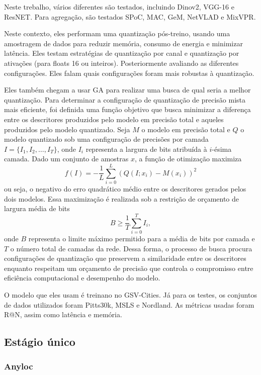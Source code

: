 \documentclass[letterpaper, 10 pt, conference]{ieeeconf}  %
\begin{document}
Neste trebalho, vários  diferentes são testados, incluindo Dinov2, VGG-16 e ResNET. Para agregação, são testados SPoC, MAC, GeM, NetVLAD e MixVPR. 

Neste contexto, eles performam uma quantização pós-treino, usando uma amostragem de dados para reduzir memória, consumo de energia e minimizar latência. Eles testam estratégias de quantização por canal e quantização por ativações (para floats 16 ou inteiros). Posteriormente avaliando as diferentes configurações. Eles falam quais configurações foram mais robustas à quantização.

Eles também chegam a usar GA para realizar uma busca de qual seria a melhor quantização. Para determinar a configuração de quantização de precisão mista mais eficiente, foi definida uma função objetivo que busca minimizar a diferença entre os descritores produzidos pelo modelo em precisão total e aqueles produzidos pelo modelo quantizado. Seja $M$ o modelo em precisão total e $Q$ o modelo quantizado sob uma configuração de precisões por camada $I = \{I_1, I_2, \dots, I_T\}$, onde $I_i$ representa a largura de bits atribuída à $i$-ésima camada. Dado um conjunto de amostras $x$, a função de otimização maximiza
$$
f(I) = -\frac{1}{L}\sum_{i=0}^{L}\left(Q(I; x_i) - M(x_i)\right)^2
$$
\noindent
ou seja, o negativo do erro quadrático médio entre os descritores gerados pelos dois modelos. Essa maximização é realizada sob a restrição de orçamento de largura média de bits
$$
B \ge \frac{1}{T}\sum_{i=0}^{T} I_i ,
$$
\noindent
onde $B$ representa o limite máximo permitido para a média de bits por camada e $T$ o número total de camadas da rede. Dessa forma, o processo de busca procura configurações de quantização que preservem a similaridade entre os descritores enquanto respeitam um orçamento de precisão que controla o compromisso entre eficiência computacional e desempenho do modelo.

O modelo que eles usam é treinano no GSV-Cities. Já para os testes, os conjuntos de dados utilizados foram Pitts30k, MSLS e Nordland. As métricas usadas foram R@N, assim como latência e memória.

\subsection{Estágio único}

\subsubsection{Anyloc}
\end{document}
